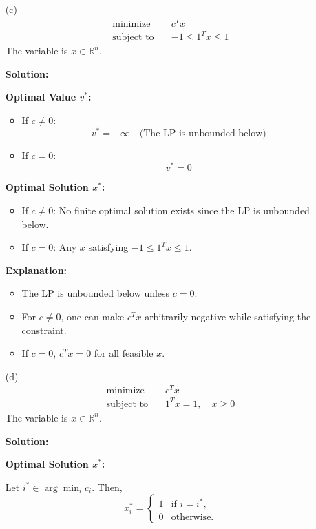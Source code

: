 \documentclass{article}
\begin{document}
\begin{enumerate}
    \item[(c)]
    \begin{align*}
        \text{minimize} \quad & c^T x \\
        \text{subject to} \quad & -1 \leq 1^T x \leq 1
    \end{align*}
    The variable is $x \in \mathbb{R}^n$.

    \textbf{Solution:}

    \textbf{Optimal Value $v^*$:}
    \begin{itemize}
        \item If $c \neq 0$:
        \[
        v^* = -\infty \quad \text{(The LP is unbounded below)}
        \]
        \item If $c = 0$:
        \[
        v^* = 0
        \]
    \end{itemize}

    \textbf{Optimal Solution $x^*$:}
    \begin{itemize}
        \item If $c \neq 0$: No finite optimal solution exists since the LP is unbounded below.
        \item If $c = 0$: Any $x$ satisfying $-1 \leq 1^T x \leq 1$.
    \end{itemize}

    \textbf{Explanation:}
    \begin{itemize}
    \item The LP is unbounded below unless $c = 0$.
    \item For $c \neq 0$, one can make $c^T x$ arbitrarily negative while satisfying the constraint.
    \item If $c = 0$, $c^T x = 0$ for all feasible $x$.
    \end{itemize}

    \item[(d)]
    \begin{align*}
        \text{minimize} \quad & c^T x \\
        \text{subject to} \quad & 1^T x = 1, \quad x \geq 0
    \end{align*}
    The variable is $x \in \mathbb{R}^n$.

    \textbf{Solution:}

    \textbf{Optimal Solution $x^*$:}

    Let $i^* \in \arg\min_{i} c_i$. Then,
    \[
    x_i^* = \begin{cases}
    1 & \text{if } i = i^*, \\
    0 & \text{otherwise}.
    \end{cases}
    \]


\end{enumerate}
\end{document}
